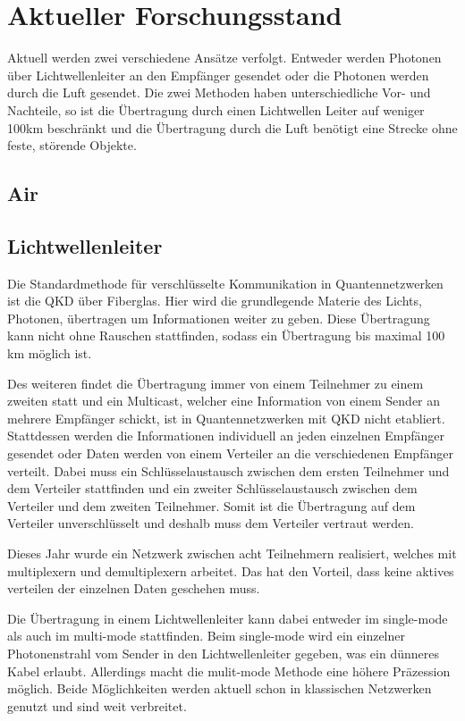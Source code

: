\chapter{Aktueller Forschungsstand}

Aktuell werden zwei verschiedene Ansätze verfolgt.
Entweder werden Photonen über Lichtwellenleiter an den Empfänger gesendet oder die Photonen werden durch die Luft gesendet.
Die zwei Methoden haben unterschiedliche Vor- und Nachteile, so ist die Übertragung durch einen Lichtwellen Leiter auf weniger 100km beschränkt und die Übertragung durch die Luft benötigt eine Strecke ohne feste, störende Objekte.

\section{Air}
\section{Lichtwellenleiter}

Die Standardmethode für verschlüsselte Kommunikation in Quantennetzwerken ist die \ac{QKD} über Fiberglas.
Hier wird die grundlegende Materie des Lichts, Photonen, übertragen um Informationen weiter zu geben.
Diese Übertragung kann nicht ohne Rauschen stattfinden, sodass ein Übertragung bis maximal 100 km möglich ist\cite{Shen2018}.

Des weiteren findet die Übertragung immer von einem Teilnehmer zu einem zweiten statt und ein Multicast, welcher eine Information von einem Sender an mehrere Empfänger schickt, ist in Quantennetzwerken mit \ac{QKD} nicht etabliert.
Stattdessen werden die Informationen individuell an jeden einzelnen Empfänger gesendet oder Daten werden von einem Verteiler an die verschiedenen Empfänger verteilt.
Dabei muss ein Schlüsselaustausch zwischen dem ersten Teilnehmer und dem Verteiler stattfinden und ein zweiter Schlüsselaustausch zwischen dem Verteiler und dem zweiten Teilnehmer.
Somit ist die Übertragung auf dem Verteiler unverschlüsselt und deshalb muss dem Verteiler vertraut werden\cite{Qui2018}.

Dieses Jahr wurde ein Netzwerk zwischen acht Teilnehmern realisiert, welches mit multiplexern und demultiplexern arbeitet.
Das hat den Vorteil, dass keine aktives verteilen der einzelnen Daten geschehen muss\cite{Siddarth2020}.

Die Übertragung in einem Lichtwellenleiter kann dabei entweder im single-mode als auch im multi-mode stattfinden.
Beim single-mode wird ein einzelner Photonenstrahl vom Sender in den Lichtwellenleiter gegeben, was ein dünneres Kabel erlaubt.
Allerdings macht die mulit-mode Methode eine höhere Präzession möglich\cite{VanMeter2014}.
Beide Möglichkeiten werden aktuell schon in klassischen Netzwerken genutzt und sind weit verbreitet.


